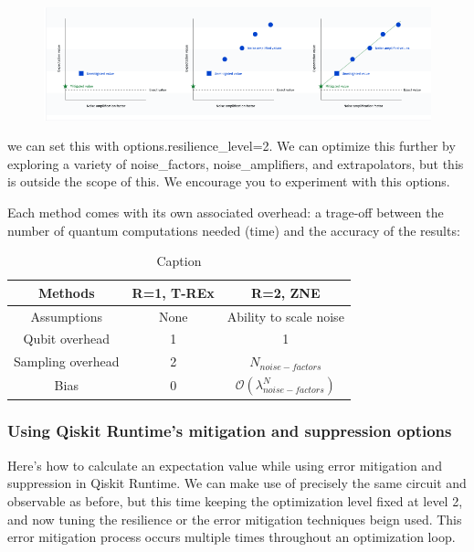 \documentclass[12pt, oneside]{book}
\theoremstyle{definition}
\theoremstyle{definition}
\theoremstyle{remark}
\begin{document}
\begin{figure}[H]
    \centering
    \includegraphics[width=0.5\linewidth]{../images/zne.png}
\end{figure}

we can set this with options.resilience\_level=2. We can optimize this further by exploring a variety of noise\_factors, noise\_amplifiers, and extrapolators, but this is outside the scope of this. We encourage you to experiment with this options.

Each method comes with its own associated overhead: a trage-off between the number of quantum computations needed (time) and the accuracy of the results:

\begin{table}[H]
    \centering
    \begin{tabular}{c|c|c}
    Methods & R=1, T-REx & R=2, ZNE \\
    \hline
    Assumptions  & None & Ability to scale noise\\
         Qubit overhead &  1  &  1\\
         Sampling overhead& 2 & $N_{noise-factors}$\\
         Bias & 0 & $\mathcal{O}(\lambda^N_{noise-factors})$\\
    \end{tabular}
    \caption{Caption}
    \label{tab:my_label}
\end{table}

\subsubsection{Using Qiskit Runtime's mitigation and suppression options}
Here's how to calculate an expectation value while using error mitigation and suppression in Qiskit Runtime. We can make use of precisely the same circuit and observable as before, but this time keeping the optimization level fixed at level 2, and now tuning the resilience or the error mitigation techniques beign used. This error mitigation process occurs multiple times throughout an optimization loop.
\end{document}

